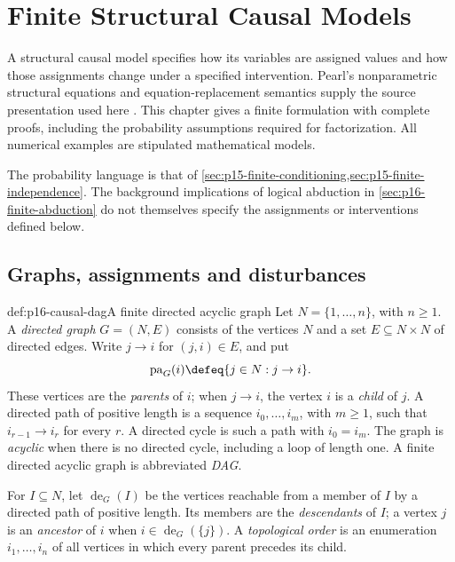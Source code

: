 \chapter{Finite Structural Causal Models}
\label{sec:p16-finite-causal-models}

A structural causal model specifies how its variables are assigned values
and how those assignments change under a specified intervention. Pearl's
nonparametric structural equations and equation-replacement semantics supply
the source presentation used here
\cite[secs.~3.1--3.2.3, pp.~103--112]{Pearl2009CausalOverview}.
This chapter gives a finite formulation with complete proofs, including the
probability assumptions required for factorization. All numerical examples
are stipulated mathematical models.

The probability language is that of
\cref{sec:p15-finite-conditioning,sec:p15-finite-independence}.
The background implications of logical abduction in
\cref{sec:p16-finite-abduction} do not themselves specify the assignments
or interventions defined below.

\section{Graphs, assignments and disturbances}
\label{sec:p16-causal-model-data}

\begin{hbdefinition}{def:p16-causal-dag}{A finite directed acyclic graph}
Let \(N=\{1,\ldots,n\}\), with \(n\geq1\). A \emph{directed graph}
\(G=(N,E)\) consists of the vertices \(N\) and a set
\(E\subseteq N\times N\) of directed edges. Write \(j\to i\)
for \((j,i)\in E\), and put
\[
 \operatorname{pa}_G(i)\defeq\{j\in N:j\to i\}.
\]
These vertices are the \emph{parents} of \(i\); when \(j\to i\), the
vertex \(i\) is a \emph{child} of \(j\). A directed path of
positive length is a sequence \(i_0,\ldots,i_m\), with \(m\geq1\),
such that \(i_{r-1}\to i_r\) for every \(r\). A directed cycle
is such a path with \(i_0=i_m\). The graph is \emph{acyclic} when
there is no directed cycle, including a loop of length one. A finite
directed acyclic graph is abbreviated \emph{DAG}.

For \(I\subseteq N\), let \(\operatorname{de}_G(I)\) be the vertices
reachable from a member of \(I\) by a directed path of positive length.
Its members are the \emph{descendants} of \(I\); a vertex \(j\) is an
\emph{ancestor} of \(i\) when \(i\in\operatorname{de}_G(\{j\})\).
A \emph{topological order} is an enumeration \(i_1,\ldots,i_n\) of
all vertices in which every parent precedes its child.
\end{hbdefinition}

